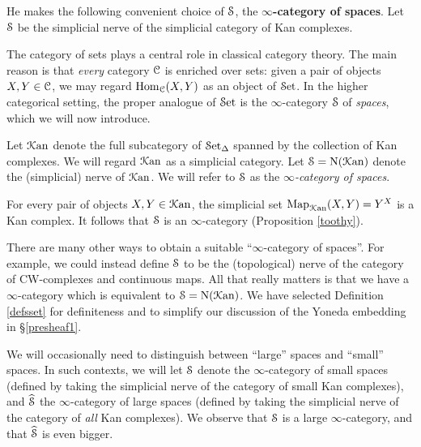 \begin{1.2.16 The inf-cat of spaces}
\begin{shaded}
He makes the following convenient choice of $\operatorname{\mathcal{S}}$, the \textbf{$\infty$-category of spaces}. Let $\operatorname{\mathcal{S}}$ be the simplicial nerve of the simplicial category of Kan complexes.
\end{shaded}
The category of sets plays a central role in classical category theory. The main reason
is that {\em every} category $\operatorname{\mathcal{C}}$ is enriched over sets: given a pair of objects
$X,Y \in \operatorname{\mathcal{C}}$, we may regard $\operatorname{Hom}_{\operatorname{\mathcal{C}}}(X,Y)$ as an object of $\operatorname{\mathcal{S}et}$.
In the higher categorical setting, the proper analogue of $\operatorname{\mathcal{S}et}$ is the
$\infty$-category $\operatorname{\mathcal{S}}$ of {\it spaces}, which we will now
introduce.

\begin{definition}\label{defsset}
Let $\operatorname{\mathcal{K}an}$ denote the full subcategory of $\operatorname{\mathcal{S}et_{\Delta}}$ spanned by the collection of Kan complexes. 
We will regard $\operatorname{\mathcal{K}an}$ as a simplicial category. Let $\operatorname{\mathcal{S}} = \operatorname{N}(\operatorname{\mathcal{K}an})$ denote the (simplicial) nerve of $\operatorname{\mathcal{K}an}$. We will refer to $\operatorname{\mathcal{S}}$ as the {\it $\infty$-category of spaces}.
\end{definition}

\begin{remark}
For every pair of objects $X,Y \in \operatorname{\mathcal{K}an}$, the simplicial set
$\operatorname{{Map}}_{\operatorname{\mathcal{K}an}}(X,Y) = Y^X$ is a Kan complex. It follows that
$\operatorname{\mathcal{S}}$ is an $\infty$-category (Proposition \ref{toothy}).
\end{remark}

\begin{remark}
There are many other ways to obtain a suitable ``$\infty$-category of
spaces''. For example, we could instead define $\operatorname{\mathcal{S}}$ to be the (topological) nerve
of the category of CW-complexes and continuous maps.
All that really matters is that we have a $\infty$-category which is equivalent to $\operatorname{\mathcal{S}} = \operatorname{N}(\operatorname{\mathcal{K}an})$. 
We have selected Definition \ref{defsset} for definiteness and to simplify our discussion of the
Yoneda embedding in \S \ref{presheaf1}.
\end{remark}

\begin{remark}
We will occasionally need to distinguish between ``large'' spaces and ``small'' spaces.
In such contexts, we will let $\operatorname{\mathcal{S}}$ denote the $\infty$-category of small spaces (defined
by taking the simplicial nerve of the category of small Kan complexes), and $\widehat{\operatorname{\mathcal{S}}}$ the $\infty$-category of large spaces (defined by taking the simplicial nerve of the
category of {\em all} Kan complexes). We observe that $\operatorname{\mathcal{S}}$ is a large $\infty$-category, and that
$\widehat{\operatorname{\mathcal{S}}}$ is even bigger.
\end{remark}
\end{1.2.16 The inf-cat of spaces}
